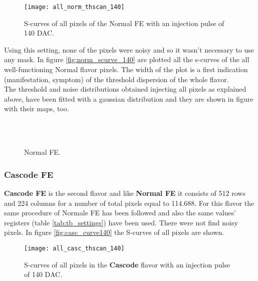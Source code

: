 \begin{figure}[h!]
\centering
\texttt{[image: all\_norm\_thscan\_140]}
\caption{S-curves of all pixels of the Normal FE with an injection pulse of 140 DAC.}
\label{fig:norm_scurve_140}
\end{figure}

Using this setting, none of the pixels were noisy and so it wasn't necessary to use any mask.
In figure \vref{fig:norm_scurve_140} are plotted all the s-curves of the all well-functioning Normal flavor pixels. The width of the plot is a first indication (manifestation, symptom) of the threshold dispersion of the whole flavor.\\

The threshold and noise distributions obtained injecting all pixels as explained above, have been fitted with a gaussian distribution and they are shown in figure \pageref{fig:thdist_norm} with their maps, too.

\begin{figure}[h!]
\centering
{}\quad
{}\\
\quad
{}\\
\caption{Normal FE.}
\label{fig:norm}
\end{figure}



\subsubsection{Cascode FE}

\textbf{Cascode FE} is the second flavor and like \textbf{Normal FE} it consists of 512 rows and 224 columns for a number of total pixels equal to 114.688. For this flavor the same procedure of Normale FE has been followed and also the same values' registers (table \vref{tab:tb_settings}) have been used. There were not find noisy pixels. 
In figure \vref{fig:casc_curve140} the S-curves of all pixels are shown.

\begin{figure}[h!]
\centering
\texttt{[image: all\_casc\_thscan\_140]}
\caption{S-curves of all pixels in the \textbf{Cascode} flavor with an injection pulse of 140 DAC.}
\label{fig:casc_scurve140}
\end{figure}

